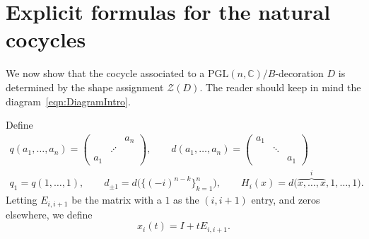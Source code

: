\documentclass[12pt]{amsart}
\theoremstyle{definition}
\numberwithin{equation}{section}
\def\cxymatrix#1{\xy*[c]\xybox{\xymatrix#1}\endxy}
\def\a{\alpha}
\def\SL{\mathrm{SL}}
\def\PGL{\mathrm{PGL}}
\def\C{\mathbb{C}}
\begin{document}
\section{Explicit formulas for the natural cocycles}\label{sec:ExplicitFormulas}
We now show that the cocycle associated to a $\PGL(n,\C)/B$-decoration $D$ is determined by the shape assignment $\mathcal Z(D)$. The reader should keep in mind the diagram~\eqref{eqn:DiagramIntro}. 

Define
\begin{equation}
\begin{gathered}
q(a_1,\dots,a_n)=\begin{pmatrix}&&a_n\\&\iddots&\\a_1&&\end{pmatrix},\qquad d(a_1,\dots,a_n)=\begin{pmatrix}a_1&&\\&\ddots&\\&&a_1\end{pmatrix}\\
q_1=q(1,\dots,1),\qquad d_{\pm 1}=d\big(\{(-i)^{n-k}\}_{k=1}^n),\qquad H_i(x)=d\big(\overbrace{x,\dots,x}^i,1,\dots,1\big).
\end{gathered}
\end{equation}  
Letting $E_{i,i+1}$ be the matrix with a $1$ as the $(i,i+1)$ entry, and zeros elsewhere, we define
\begin{equation}
x_i(t)=I+tE_{i,i+1}.
\end{equation} 
\end{document}
